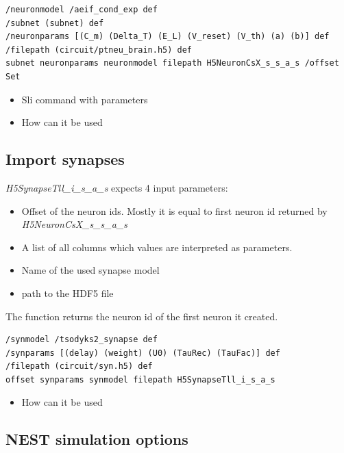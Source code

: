 \begin{lstlisting}[label=sliNeurons,caption=Calling the neuron import module via H5NeuronCsX\_s\_s\_a\_s SLI command ]
/neuronmodel /aeif_cond_exp def
/subnet (subnet) def
/neuronparams [(C_m) (Delta_T) (E_L) (V_reset) (V_th) (a) (b)] def
/filepath (circuit/ptneu_brain.h5) def
subnet neuronparams neuronmodel filepath H5NeuronCsX_s_s_a_s /offset Set
\end{lstlisting}



\begin{itemize}
      \item Sli command with parameters
      \item How can it be used
\end{itemize}

\subsection{Import synapses}
\emph{H5SynapseTll\_i\_s\_a\_s} expects 4 input parameters:
\begin{itemize}
      \item Offset of the neuron ids. Mostly it is equal to first neuron id returned by \emph{H5NeuronCsX\_s\_s\_a\_s}

      \item A list of all columns which values are interpreted as parameters.
      
      \item Name of the used synapse model
      
      \item path to the HDF5 file 
\end{itemize}
The function returns the neuron id of the first neuron it created.

\begin{lstlisting}[label=sliSynapses,caption=Example importing synapses]
/synmodel /tsodyks2_synapse def
/synparams [(delay) (weight) (U0) (TauRec) (TauFac)] def
/filepath (circuit/syn.h5) def
offset synparams synmodel filepath H5SynapseTll_i_s_a_s
\end{lstlisting}
\begin{itemize}
      \item How can it be used
\end{itemize}

\subsection{NEST simulation options}

